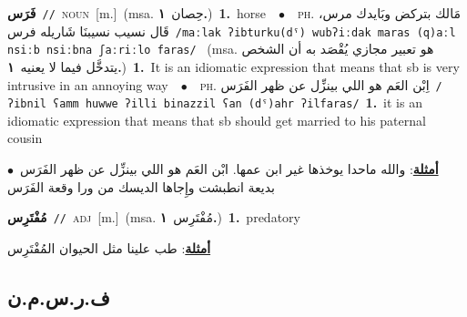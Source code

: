 \documentclass[10pt,a4paper,twoside]{article} %
\begin{document}
\begin{multicols}{2}
{\setlength\topsep{0pt}\textbf{\foreignlanguage{arabic}{فَرَس}}\ {\color{gray}\texttt{//}\color{black}}\ \textsc{noun}\ [m.]\ \color{gray}(msa. \foreignlanguage{arabic}{حِصان}~\foreignlanguage{arabic}{\textbf{١.}})\color{black}\ \textbf{1.}~horse\ \ $\bullet$\ \ \textsc{ph.} \color{gray} \foreignlanguage{arabic}{مَالك بتركض وبَايدك مرس، قَال نسيب نسيبنَا شَاريله فرس}\color{black}\ {\color{gray}\texttt{/{\sffamily maːlak ʔibturku(dˤ) wubʔiːdak maras (q)aːl nsiːb nsiːbna ʃaːriːlo faras}/}\color{black}}\ \color{gray} (msa. \foreignlanguage{arabic}{هو تعبير مجازي يُقْصَد به أن الشخص يتدخَّل فيما لا يعنيه}~\foreignlanguage{arabic}{\textbf{١.}})\color{black}\ \textbf{1.}~It is an idiomatic expression that means that sb is very intrusive in an annoying way\ \ $\bullet$\ \ \textsc{ph.} \color{gray} \foreignlanguage{arabic}{اِبْن العَم هو اللي بينزِّل عن ظهر الفَرَس}\color{black}\ {\color{gray}\texttt{/{\sffamily ʔibnil ʕamm huwwe ʔilli binazzil ʕan (dˤ)ahr ʔilfaras}/}\color{black}}\ \textbf{1.}~it is an idiomatic expression that means that sb should get married to his paternal cousin\  \begin{flushright}\color{gray}\foreignlanguage{arabic}{\textbf{\underline{\foreignlanguage{arabic}{أمثلة}}}: والله ماحدا يوخذها غير ابن عمها. ابْن العَم هو اللي بينزِّل عن ظهر الفَرَس\ $\bullet$\ \  بديعة انطبشت وإِجاها الديسك من ورا وقعة الفَرَس}\end{flushright}\color{black}} \vspace{2mm}

{\setlength\topsep{0pt}\textbf{\foreignlanguage{arabic}{مُفْتَرِس}}\ {\color{gray}\texttt{//}\color{black}}\ \textsc{adj}\ [m.]\ \color{gray}(msa. \foreignlanguage{arabic}{مُفْتَرِس}~\foreignlanguage{arabic}{\textbf{١.}})\color{black}\ \textbf{1.}~predatory\  \begin{flushright}\color{gray}\foreignlanguage{arabic}{\textbf{\underline{\foreignlanguage{arabic}{أمثلة}}}: طب علينا مثل الحيوان المُفْتَرِس}\end{flushright}\color{black}} \vspace{2mm}

\vspace{-3mm}
\subsection*{\color{blue}\foreignlanguage{arabic}{ف.ر.س.م.ن}\color{blue}{ (ntws)}} 


\end{multicols}
\end{document}
